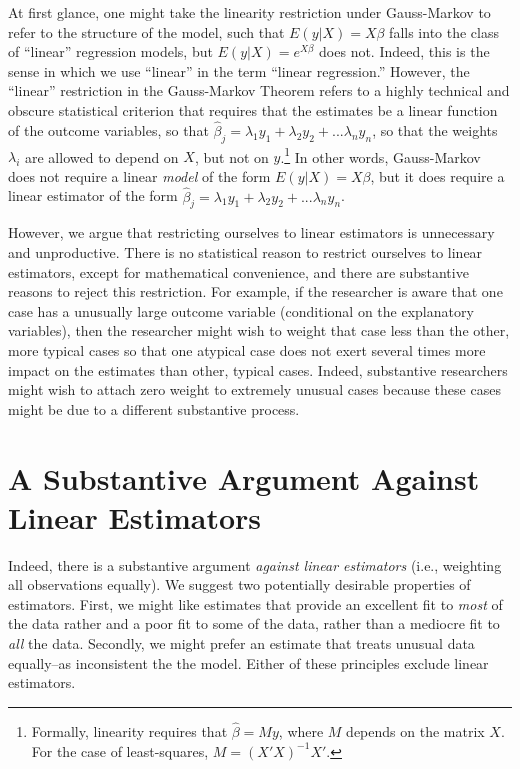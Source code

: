 \documentclass[12pt]{article}
\begin{document}
At first glance, one might take the linearity restriction under Gauss-Markov to refer to the structure of the model, such that $E(y | X) = X\beta$ falls into the class of ``linear'' regression models, but  $E(y | X) = e^{X\beta}$ does not. Indeed, this is the sense in which we use ``linear'' in the term ``linear regression.'' However, the ``linear'' restriction in the Gauss-Markov Theorem refers to a highly technical and obscure statistical criterion that requires that the estimates be a linear function of the outcome variables, so that $\hat{\beta}_j = \lambda_1 y_1 + \lambda_2 y_2 + ... \lambda_n y_n$, so that the weights $\lambda_i$ are allowed to depend on $X$, but not on $y$.\footnote{Formally, linearity requires that $\hat{\beta} = My$, where $M$ depends on the matrix $X$. For the case of least-squares, $M = (X'X)^{-1}X'$.} In other words, Gauss-Markov does not require a linear \textit{model} of the form $E(y | X) = X\beta$, but it does require a linear estimator of the form $\hat{\beta}_j = \lambda_1 y_1 + \lambda_2 y_2 + ... \lambda_n y_n$. 

However, we argue that restricting ourselves to linear estimators is unnecessary and unproductive. There is no statistical reason to restrict ourselves to linear estimators, except for mathematical convenience, and there are substantive reasons to reject this restriction. For example, if the researcher is aware that one case has a unusually large outcome variable (conditional on the explanatory variables), then the researcher might wish to weight that case less than the other, more typical cases so that one atypical case does not exert several times more impact on the estimates than other, typical cases. Indeed, substantive researchers might wish to attach zero weight to extremely unusual cases because these cases might be due to a different substantive process.

\section*{A Substantive Argument Against Linear Estimators}

Indeed, there is a substantive argument \textit{against linear estimators} (i.e., weighting all observations equally). We suggest two potentially desirable properties of estimators. First, we might like estimates that provide an excellent fit to \textit{most} of the data rather and a poor fit to some of the data, rather than a mediocre fit to \textit{all} the data. Secondly, we might prefer an estimate that treats unusual data equally--as inconsistent the the model. Either of these principles exclude linear estimators.
\end{document}
